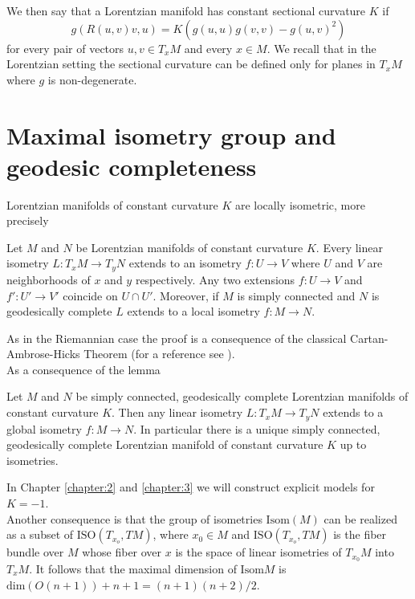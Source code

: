 \noindent We then say that a Lorentzian manifold has constant sectional curvature $K$ if
\begin{equation}\label{sectionalcurvature}
    g(R(u,v)v,u)=K(g(u,u)g(v,v)-g(u,v)^2) 
\end{equation}
for every pair of vectors $u,v \in T_{x}M$ and every $x\in M$. We recall that in the Lorentzian setting the sectional curvature can be defined only for planes in $T_{x}M$ where $g$ is non-degenerate.\\


\section{Maximal isometry group and geodesic completeness}
Lorentzian manifolds of constant curvature $K$ are locally isometric, more precisely
\begin{lemma}
    Let $M$ and $N$ be Lorentzian manifolds of constant curvature $K$. Every linear isometry $L: T_x M \to T_y N$ extends to an isometry $f: U \to V$ where $U$ and $V$ are neighborhoods of $x$ and $y$ respectively. Any two extensions $f:U\to V$ and $f' : U' \to V'$ coincide on $U \cap U'$. Moreover, if $M$ is simply connected and $N$ is geodesically complete $L$ extends to a local isometry $f:M\to N$.
\end{lemma}
As in the Riemannian case the proof is a consequence of the classical Cartan-Ambrose-Hicks Theorem (for a reference see \cite{piccione2005single}).\\
As a consequence of the lemma
\begin{corollary}
    Let $M$ and $N$ be simply connected, geodesically complete Lorentzian manifolds of constant curvature $K$. Then any linear isometry $L: T_x M \to T_y N$ extends to a global isometry $f: M \to N$. In particular there is a unique simply connected, geodesically complete Lorentzian manifold of constant curvature $K$ up to isometries.
\end{corollary}
\noindent In Chapter \ref{chapter:2} and \ref{chapter:3} we will construct explicit models for $K=-1$.\\
Another consequence is that the group of isometries $\text{Isom}(M)$ can be realized as a subset of $\text{ISO}(T_{x_o}, TM)$, where $x_0 \in M$ and $\text{ISO}(T_{x_o}, TM)$ is the fiber bundle over $M$ whose fiber over $x$ is the space of linear isometries of $T_{x_0}M$ into $T_xM$.
It follows that the maximal dimension of $\text{Isom}M$ is $\text{dim}(O(n+1)) + n +1 = (n+1)(n+2)/2$.\\
